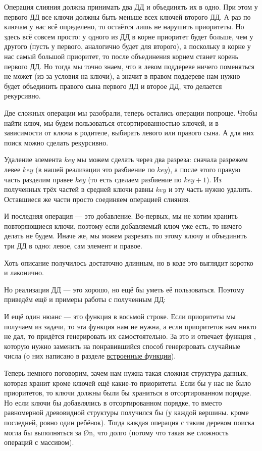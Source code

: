Операция слияния должна принимать два ДД и объединять их в одно. При этом у первого ДД все ключи должны быть меньше всех ключей второго ДД. А раз по ключам у нас всё определено, то остаётся лишь не нарушить приоритеты. Но здесь всё совсем просто: у одного из ДД в корне приоритет будет больше, чем у другого (пусть у первого, аналогично будет для второго), а поскольку в корне у нас самый большой приоритет, то после объединения корнем станет корень первого ДД. Но тогда мы точно знаем, что в левом поддереве ничего поменяться не может (из-за условия на ключи), а значит в правом поддереве нам нужно будет объединить правого сына первого ДД и второе ДД, что делается рекурсивно.

Две сложных операции мы разобрали, теперь остались операции попроще. Чтобы найти ключ, мы будем пользоваться отсортированностью ключей, и в зависимости от ключа в родителе, выбирать левого или правого сына. А для них поиск можно сделать рекурсивно.

Удаление элемента $key$ мы можем сделать через два разреза: сначала разрежем левее $key$ (в нашей реализации это разбиение по $key$), а после этого правую часть разделим правее $key$ (то есть сделаем разбиение по $key + 1$). Из полученных трёх частей в средней ключи равны $key$ и эту часть нужно удалить. Оставшиеся же части просто соединяем операцией слияния.

И последняя операция — это добавление. Во-первых, мы не хотим хранить повторяющиеся ключи, поэтому если добавляемый ключ уже есть, то ничего делать не будем. Иначе же, мы можем разрезать по этому ключу и объединить три ДД в одно: левое, сам элемент и правое.

Хоть описание получилось достаточно длинным, но в коде это выглядит коротко и лаконично.


Но реализация ДД — это хорошо, но ещё бы уметь её пользоваться. Поэтому приведём ещё и примеры работы с полученным ДД:


И ещё один нюанс — это функция  в восьмой строке. Если приоритеты мы получаем из задачи, то эта функция нам не нужна, а если приоритетов нам никто не дал, то придётся генерировать их самостоятельно. За это и отвечает функция , которую нужно заменить на понравившийся способ генерировать случайные числа (о них написано в разделе \hyperlink{built-in function}{встроенные функции}).

Теперь немного поговорим, зачем нам нужна такая сложная структура данных, которая хранит кроме ключей ещё какие-то приоритеты. Если бы у нас не было приоритетов, то ключи должны были бы храниться в отсортированном порядке. Но если ключи бы добавлялись в отсортированном порядке, то вместо равномерной древовидной структуры получился бы  (у каждой вершины. кроме последней, ровно один ребёнок). Тогда каждая операция с таким деревом поиска могла бы выполняться за \O{n}, что долго (потому что такая же сложность операций с массивом).

